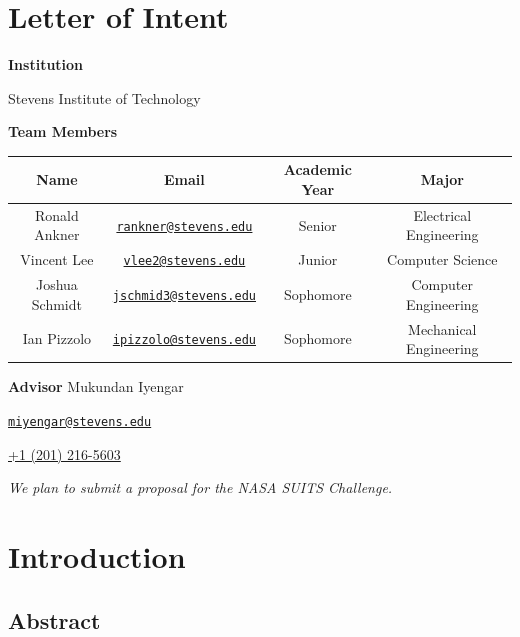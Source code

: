 \documentclass{article}
\let\Oldsection\section
\renewcommand{\section}{\FloatBarrier\Oldsection}
\let\Oldsubsection\subsection
\renewcommand{\subsection}{\FloatBarrier\Oldsubsection}
\begin{document}
\newpage

\section{Letter of Intent}

\begin{center}

\bigskip
\bigskip
\textbf{Institution}

Stevens Institute of Technology

\bigskip

\textbf{Team Members}

\bigskip
\bigskip

\begin{tabular}{||c c c c||} 
 \hline
 Name & Email & Academic Year & Major \\ [0.5ex] 
 \hline\hline
 Ronald Ankner & \href{mailto:rankner@stevens.edu}{\nolinkurl{rankner@stevens.edu}} & Senior & Electrical Engineering \\ 
 \hline
 Vincent Lee & \href{mailto:vlee2@stevens.edu}{\nolinkurl{vlee2@stevens.edu}} & Junior & Computer Science \\
 \hline
 Joshua Schmidt & \href{mailto:jschmid3@stevens.edu}{\nolinkurl{jschmid3@stevens.edu}} & Sophomore & Computer Engineering \\
 \hline
 Ian Pizzolo & \href{mailto:ipizzolo@stevens.edu}{\nolinkurl{ipizzolo@stevens.edu}} & Sophomore & Mechanical Engineering \\
 \hline
\end{tabular}

\bigskip
\bigskip

\textbf{Advisor}
\bigskip
Mukundan Iyengar

\href{mailto:miyengar@stevens.edu}{\nolinkurl{miyengar@stevens.edu}}

\href{tel:12012165603}{+1 (201) 216-5603}

\bigskip
\bigskip
\textit{We plan to submit a proposal for the NASA SUITS Challenge.}

\end{center}

\newpage

\section{Introduction}

\subsection{Abstract}
\end{document}
